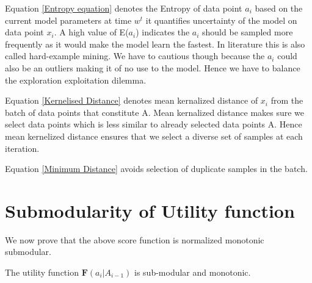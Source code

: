 \documentclass[a4paper,twoside]{iiththesis}
\theoremstyle{definition}
\theoremstyle{definition}
\theoremstyle{remark}
\begin{document}
Equation \ref{Entropy equation} denotes the Entropy of data point $a_i$ based on the current model parameters at time $w^t$ it quantifies uncertainty of the model on data point $x_i$. A high value of E($a_i$)
indicates the $a_i$ should be sampled more frequently as it would make the model learn the fastest. In literature this is also called hard-example mining. We have to cautious though because the $a_i$ could also be an outliers making it of no use to the model. Hence we have to balance the exploration exploitation dilemma. 

Equation \ref{Kernelised Distance} denotes mean kernalized distance of $x_i$ from the batch of data points that constitute A. Mean kernalized distance makes sure we select data points which is less similar to already selected data points A. Hence mean kernelized distance ensures that we select a diverse set of samples at each iteration.

Equation \ref{Minimum Distance} avoids selection of duplicate samples in the batch.

\section{Submodularity of Utility function}

We now prove that the above score function is normalized monotonic submodular. \\
\begin{lemma}
The utility function $\mathbf{F}(a_i | A_{i-1})$ is sub-modular and monotonic.
\end{lemma}
\end{document}
